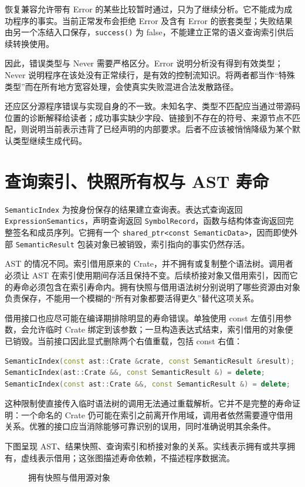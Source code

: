 恢复兼容允许带有 Error 的某些比较暂时通过，只为了继续分析。它不能成为成功程序的事实。当前正常发布会拒绝 Error 及含有 Error 的嵌套类型；失败结果由另一个冻结入口保存，\texttt{success()} 为 false，不能建立正常的语义查询索引供后续转换使用。

因此，错误类型与 Never 需要严格区分。Error 说明分析没有得到有效类型；Never 说明程序在该处没有正常续行，是有效的控制流知识。将两者都当作“特殊类型”而在所有地方宽容处理，会使真实失败混进合法发散路径。

还应区分源程序错误与实现自身的不一致。未知名字、类型不匹配应当通过带源码位置的诊断解释给读者；成功事实缺少字段、链接到不存在的符号、来源节点不匹配，则说明当前表示违背了已经声明的内部要求。后者不应该被悄悄降级为某个默认类型继续生成代码。

\section{查询索引、快照所有权与 AST 寿命}
\texttt{SemanticIndex} 为按身份保存的结果建立查询表。表达式查询返回 \texttt{ExpressionSemantics}，声明查询返回 \texttt{SymbolRecord}，函数与结构体查询返回完整签名和成员序列。它拥有一个 \texttt{shared\_ptr<const SemanticData>}，因而即使外部 \texttt{SemanticResult} 包装对象已被销毁，索引指向的事实仍然存活。

AST 的情况不同。索引借用原来的 Crate，并不拥有或复制整个语法树。调用者必须让 AST 在索引使用期间存活且保持不变。后续桥接对象又借用索引，因而它的寿命必须包含在索引寿命内。拥有快照与借用语法树分别说明了哪些资源由对象负责保存，不能用一个模糊的“所有对象都要活得更久”替代这项关系。

借用接口也应尽可能在编译期排除明显的寿命错误。单独使用 const 左值引用参数，会允许临时 Crate 绑定到该参数；一旦构造表达式结束，索引借用的对象便已销毁。当前接口因此显式删除两个右值重载，包括 const 右值：
\begin{lstlisting}[language=C++]
SemanticIndex(const ast::Crate &crate, const SemanticResult &result);
SemanticIndex(ast::Crate &&, const SemanticResult &) = delete;
SemanticIndex(const ast::Crate &&, const SemanticResult &) = delete;
\end{lstlisting}
这种限制使直接传入临时语法树的调用无法通过重载解析。它并不是完整的寿命证明：一个命名的 Crate 仍可能在索引之前离开作用域，调用者依然需要遵守借用关系。优雅的接口应当消除能够可靠识别的误用，同时准确说明其余条件。

下图呈现 AST、结果快照、查询索引和桥接对象的关系。实线表示拥有或共享拥有，虚线表示借用；这张图描述寿命依赖，不描述程序数据流。
\begin{figure}[htbp]
\centering
{}
\caption{拥有快照与借用源对象}
\end{figure}

